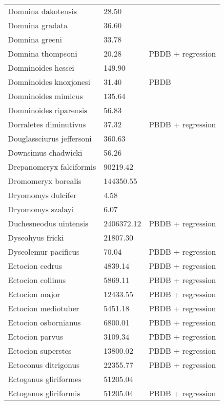 \begin{center}
\begin{longtable}{p{} p{} p{} }
  Domnina dakotensis & 28.50 & \cite{Tomiya2013} \\ 
  Domnina gradata & 36.60 & \cite{Tomiya2013} \\ 
  Domnina greeni & 33.78 & \cite{Tomiya2013} \\ 
  Domnina thompsoni & 20.28 & PBDB + regression \\ 
  Domninoides hessei & 149.90 & \cite{Tomiya2013} \\ 
  Domninoides knoxjonesi & 31.40 & PBDB \\ 
  Domninoides mimicus & 135.64 & \cite{Tomiya2013} \\ 
  Domninoides riparensis & 56.83 & \cite{Tomiya2013} \\ 
  Dorraletes diminutivus & 37.32 & PBDB + regression \\ 
  Douglassciurus jeffersoni & 360.63 & \cite{Mihlbachler2006} \\ 
  Downsimus chadwicki & 56.26 & \cite{Tomiya2013} \\ 
  Drepanomeryx falciformis & 90219.42 & \cite{Tomiya2013} \\ 
  Dromomeryx borealis & 144350.55 & \cite{Tomiya2013} \\ 
  Dryomomys dulcifer & 4.58 & \cite{Novacek1977} \\ 
  Dryomomys szalayi & 6.07 & \cite{Novacek1977} \\ 
  Duchesneodus uintensis & 2406372.12 & PBDB + regression \\ 
  Dyseohyus fricki & 21807.30 & \cite{Tomiya2013} \\ 
  Dyseolemur pacificus & 70.04 & PBDB + regression \\ 
  Ectocion cedrus & 4839.14 & PBDB + regression \\ 
  Ectocion collinus & 5869.11 & PBDB + regression \\ 
  Ectocion major & 12433.55 & PBDB + regression \\ 
  Ectocion mediotuber & 5451.18 & PBDB + regression \\ 
  Ectocion osbornianus & 6800.01 & PBDB + regression \\ 
  Ectocion parvus & 3109.34 & PBDB + regression \\ 
  Ectocion superstes & 13800.02 & PBDB + regression \\ 
  Ectoconus ditrigonus & 22355.77 & PBDB + regression \\ 
  Ectoganus gliriformes & 51205.04 & \cite{Novacek1977} \\ 
  Ectoganus gliriformis & 51205.04 & PBDB + regression \\ 

\end{longtable}
\end{center}
